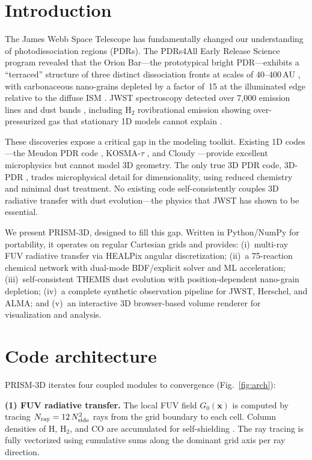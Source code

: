 \documentclass[twocolumn,letterpaper]{article}
\newcommand{\Gzero}{G_0}
\newcommand{\HH}{\mathrm{H_2}}
\begin{document}
\section{Introduction}
\label{sec:intro}

The James Webb Space Telescope has fundamentally changed our understanding of
photodissociation regions (PDRs). The PDRs4All Early Release Science program
\citep{Berne2022} revealed that the Orion Bar---the prototypical bright PDR---exhibits
a ``terraced'' structure of three distinct dissociation fronts at scales of 40--400\,AU
\citep{Habart2024}, with carbonaceous nano-grains depleted by a factor of~15 at the
illuminated edge relative to the diffuse ISM \citep{Elyajouri2024}. JWST spectroscopy
detected over 7{,}000 emission lines and dust bands \citep{Peeters2024}, including
H$_2$ rovibrational emission showing over-pressurized gas that stationary 1D models
cannot explain \citep{Zannese2025}.

These discoveries expose a critical gap in the modeling toolkit. Existing 1D codes---the
Meudon PDR code \citep{LePetit2006}, KOSMA-$\tau$ \citep{Roellig2022}, and Cloudy
\citep{Ferland2025}---provide excellent microphysics but cannot model 3D geometry.
The only true 3D PDR code, 3D-PDR \citep{Bisbas2012}, trades microphysical detail
for dimensionality, using reduced chemistry and minimal dust treatment. No existing code
self-consistently couples 3D radiative transfer with dust evolution---the physics that
JWST has shown to be essential.

We present PRISM-3D, designed to fill this gap. Written in Python/NumPy for portability,
it operates on regular Cartesian grids and provides: (i)~multi-ray FUV radiative transfer
via HEALPix angular discretization; (ii)~a 75-reaction chemical network with dual-mode
BDF/explicit solver and ML acceleration; (iii)~self-consistent THEMIS dust evolution with
position-dependent nano-grain depletion; (iv)~a complete synthetic observation pipeline for
JWST, Herschel, and ALMA; and (v)~an interactive 3D browser-based volume renderer for
visualization and analysis.


\section{Code architecture}
\label{sec:architecture}

PRISM-3D iterates four coupled modules to convergence (Fig.~\ref{fig:arch}):

\smallskip\noindent\textbf{(1) FUV radiative transfer.}
The local FUV field $\Gzero(\mathbf{x})$ is computed by tracing $N_{\rm ray} = 12\,N_{\rm side}^2$
rays from the grid boundary to each cell. Column densities of H, $\HH$, and CO are
accumulated for self-shielding \citep{Draine1996,Visser2009}. The ray tracing is
fully vectorized using cumulative sums along the dominant grid axis per ray direction.
\end{document}
